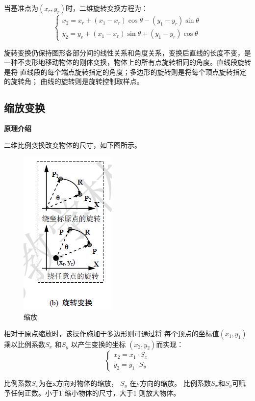 \documentclass[a4paper,UTF8]{article}
\theoremstyle{definition}
\begin{document}
当基准点为$(x_r,y_r)$时，二维旋转变换方程为：
\begin{equation}
    \left\{
                 \begin{array}{lr}
                 x_2 = x_r + (x_1 - x_r)\cos \theta - (y_1 - y_r) \sin \theta\\
                 y_2 = y_r + (x_1 - x_r) \sin \theta + (y_1 - y_r) \cos \theta 
                 \end{array}
    \right.
\end{equation}

旋转变换仍保持图形各部分间的线性关系和角度关系，变换后直线的长度不变，是
一种不变形地移动物体的刚体变换，物体上的所有点旋转相同的角度。直线段旋转是将
直线段的每个端点旋转指定的角度；多边形的旋转则是将每个顶点旋转指定的旋转角；
曲线的旋转则是旋转控制取样点。\cite{move}
\subsection{缩放变换}
\textbf{原理介绍}\par
二维比例变换改变物体的尺寸，如下图所示。
\begin{figure}[h]

    \centering
    \includegraphics[width = .2\textwidth]{rotate.jpg}
    \caption{缩放}
    \label{fig:label8}
\end{figure}
相对于原点缩放时，该操作施加于多边形则可通过将
每个顶点的坐标值$(x_1,y_1)$乘以比例系数$S_x$ 和$S_y$ 以产生变换的坐标
$(x_2,y_2)$而实现：
\begin{equation}
    \left\{
                 \begin{array}{lr}
                 x_2 = x_1\cdot S_x\\
                 y_2 = y_1\cdot S_y 
                 \end{array}
    \right.
\end{equation}

比例系数$S_x$为在x方向对物体的缩放， $S_y$ 在y方向的缩放。
比例系数$S_x$和$S_y$可赋
予任何正数。小于1 缩小物体的尺寸，大于1 则放大物体。
\end{document}
